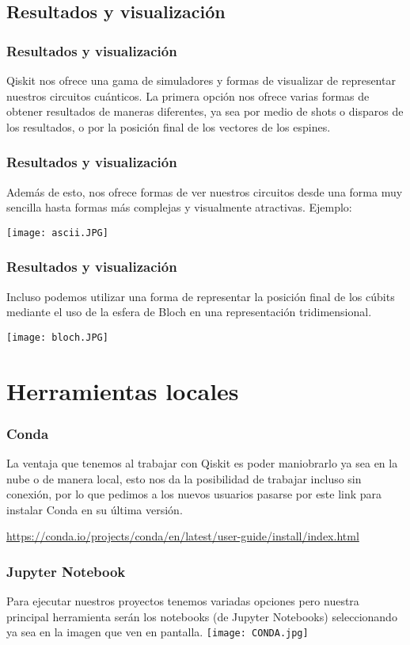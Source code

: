 \documentclass[spanish]{beamer}
\begin{document}
\newpage\justify
\begin{frame}\subsection{Resultados y visualización}
\frametitle{Resultados y visualización}
Qiskit nos ofrece una gama de simuladores y formas de visualizar de representar nuestros circuitos cuánticos. La primera opción nos ofrece varias formas de obtener resultados de maneras diferentes, ya sea por medio de shots o disparos de los resultados, o por la posición final de los vectores de los espines.
\end{frame}

\newpage\justify
\begin{frame}
\frametitle{Resultados y visualización}
Además de esto, nos ofrece formas de ver nuestros circuitos desde una forma muy sencilla hasta formas más complejas y visualmente atractivas. Ejemplo:

\centering\texttt{[image: ascii.JPG]}
\end{frame}

\newpage\justify
\begin{frame}
\frametitle{Resultados y visualización}
Incluso podemos utilizar una forma de representar la posición final de los cúbits mediante el uso de la esfera de Bloch en una representación tridimensional.

\centering\texttt{[image: bloch.JPG]}
\end{frame}
\section{Herramientas locales}        
 \setlength{\parskip}{1mm}
 \begin{frame}[fragile]
 \frametitle{Conda} 
 \justify 
La ventaja que tenemos al trabajar con Qiskit es poder maniobrarlo ya sea en la nube o de manera local, esto nos da la posibilidad de trabajar incluso sin conexión, por lo que pedimos a los nuevos usuarios pasarse por este link para instalar Conda en su última versión.
 
\url{https://conda.io/projects/conda/en/latest/user-guide/install/index.html} 
\end{frame}

       
 \newpage\setlength{\parskip}{1mm}
 \begin{frame}[fragile]
 \frametitle{Jupyter Notebook} 
 \justify 
 Para ejecutar nuestros proyectos tenemos variadas opciones pero nuestra principal herramienta serán los notebooks (de Jupyter Notebooks) seleccionando ya sea en la imagen que ven en pantalla.
\centering\texttt{[image: CONDA.jpg]}
\end{frame}
\end{document}
